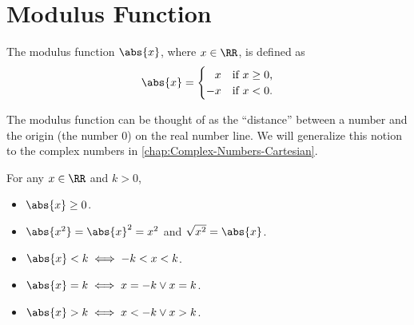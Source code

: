\section{Modulus Function}

\begin{definition}
    The modulus function $\abs{x}$, where $x \in \RR$, is defined as \[\abs{x} = \begin{cases}
        \phantom{-}x & \text{if $x \geq 0$,}\\
        -x & \text{if $x < 0$.}
    \end{cases}\]
\end{definition}

The modulus function can be thought of as the ``distance'' between a number and the origin (the number 0) on the real number line. We will generalize this notion to the complex numbers in \SS\ref{chap:Complex-Numbers-Cartesian}.

\begin{fact}
    For any $x \in \RR$ and $k > 0$,
    \begin{itemize}
        \item $\abs{x} \geq 0$.
        \item $\abs{x^2} = \abs{x}^2 = x^2$ and $\sqrt{x^2} = \abs{x}$.
        \item $\abs{x} < k \iff -k < x < k$.
        \item $\abs{x} = k \iff x = -k \lor x = k$.
        \item $\abs{x} > k \iff x < -k \lor x > k$.
    \end{itemize}
\end{fact}